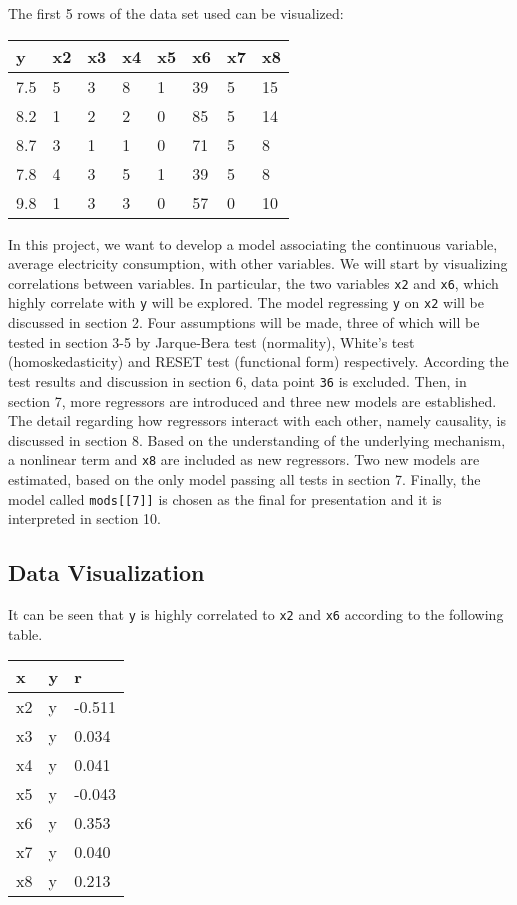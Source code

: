 The first 5 rows of the data set used can be visualized:

\begin{table}[H]
\centering
\begin{tabular}{llllllll}
\toprule
y & x2 & x3 & x4 & x5 & x6 & x7 & x8\\
\midrule
7.5 & 5 & 3 & 8 & 1 & 39 & 5 & 15\\
8.2 & 1 & 2 & 2 & 0 & 85 & 5 & 14\\
8.7 & 3 & 1 & 1 & 0 & 71 & 5 & 8\\
7.8 & 4 & 3 & 5 & 1 & 39 & 5 & 8\\
9.8 & 1 & 3 & 3 & 0 & 57 & 0 & 10\\
\bottomrule
\end{tabular}
\end{table}

In this project, we want to develop a model associating the continuous
variable, average electricity consumption, with other variables. We will
start by visualizing correlations between variables. In particular, the
two variables \texttt{x2} and \texttt{x6}, which highly correlate with
\texttt{y} will be explored. The model regressing \texttt{y} on
\texttt{x2} will be discussed in section 2. Four assumptions will be
made, three of which will be tested in section 3-5 by Jarque-Bera test
(normality), White's test (homoskedasticity) and RESET test (functional
form) respectively. According the test results and discussion in section
6, data point \texttt{36} is excluded. Then, in section 7, more
regressors are introduced and three new models are established. The
detail regarding how regressors interact with each other, namely
causality, is discussed in section 8. Based on the understanding of the
underlying mechanism, a nonlinear term and \texttt{x8} are included as
new regressors. Two new models are estimated, based on the only model
passing all tests in section 7. Finally, the model called
\texttt{mods{[}{[}7{]}{]}} is chosen as the final for presentation and
it is interpreted in section 10.

\hypertarget{data-visualization}{%
\subsection{Data Visualization}\label{data-visualization}}

It can be seen that \texttt{y} is highly correlated to \texttt{x2} and
\texttt{x6} according to the following table.

\begin{table}[H]
\centering
\begin{tabular}{lll}
\toprule
x & y & r\\
\midrule
x2 & y & -0.511\\
x3 & y & 0.034\\
x4 & y & 0.041\\
x5 & y & -0.043\\
x6 & y & 0.353\\
x7 & y & 0.040\\
x8 & y & 0.213\\
\bottomrule
\end{tabular}
\end{table}

